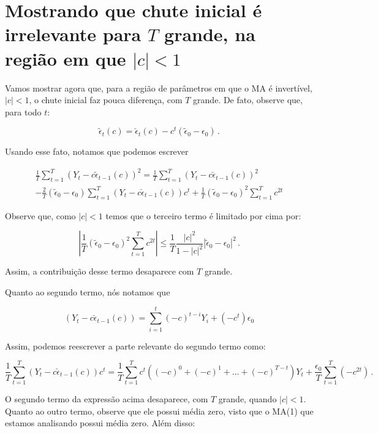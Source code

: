 \documentclass[10pt,a4paper]{article}
\begin{document}
\section{Mostrando que chute inicial é irrelevante para $T$ grande, na região em que $|c|<1$}
\label{app_mostrar}
Vamos mostrar agora que, para a região de parâmetros em que o MA é invertível, $|c|<1$, o chute inicial faz pouca diferença, com $T$ grande. De fato, observe que, para todo $t$:

$$\tilde{\epsilon}_t(c) = \check{\epsilon}_t(c) -c^t(\tilde{\epsilon}_0 - \epsilon_0)\, .$$

Usando esse fato, notamos que podemos escrever

\begin{equation}	
	\begin{aligned}
			\frac{1}{T}\sum_{t=1}^T (Y_t - c \tilde \epsilon_{t-1}(c))^2 = \frac{1}{T}\sum_{t=1}^T (Y_t - c \check \epsilon_{t-1}(c))^2 \\
		- \frac{2}{T}(\tilde{\epsilon}_0 - \epsilon_0)\sum_{t=1}^T(Y_t - c \check{\epsilon}_{t-1}(c))c^t 
		+\frac{1}{T}(\tilde{\epsilon}_0 - \epsilon_0)^2\sum_{t=1}^Tc^{2t}
	\end{aligned}
\end{equation}

Observe que, como $|c|<1$ temos que o terceiro termo é limitado por cima por:

$$\left|\frac{1}{T}(\tilde{\epsilon}_0 - \epsilon_0)^2\sum_{t=1}^Tc^{2t}\right| \leq \frac{1}{T}\frac{|c|^2}{1-|c|^2} |\tilde{\epsilon}_0 - \epsilon_0|^2 \, .$$

Assim, a contribuição desse termo desaparece com $T$ grande.

Quanto ao segundo termo, nós notamos que

$$(Y_t - c \check{\epsilon}_{t-1}(c)) = \sum_{i=1}^{t} (-c)^{t-i} Y_{i} + (-c^{t})\epsilon_0$$

Assim, podemos reescrever a parte relevante do segundo termo como:


$$	\frac{1}{T}\sum_{t=1}^T(Y_t - c \check{\epsilon}_{t-1}(c))c^t  =  \frac{1}{T}\sum_{t=1}^T c^{t}((-c)^{0} + (-c)^{1} + \ldots + (-c)^{T-t})Y_t +\frac{\epsilon_0}{T}\sum_{t=1}^T (-c^{2t})\, .$$

O segundo termo da expressão acima desaparece, com $T$ grande, quando $|c|<1$. Quanto ao outro termo, observe que ele possui média zero, visto que o MA(1) que estamos analisando possui média zero. Além disso:
\end{document}
